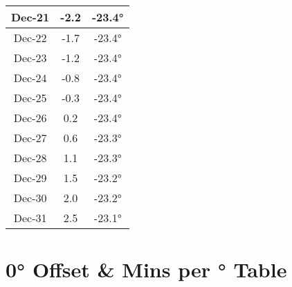 \begin{footnotesize}
\begin{minipage}{0.33\textwidth}
\begin{tabular}[t]{c | c | c}
Dec-21 & -2.2 & -23.4°\\\hline
Dec-22 & -1.7 & -23.4°\\\hline
Dec-23 & -1.2 & -23.4°\\\hline
Dec-24 & -0.8 & -23.4°\\\hline
Dec-25 & -0.3 & -23.4°\\\hline
Dec-26 & 0.2 & -23.4°\\\hline
Dec-27 & 0.6 & -23.3°\\\hline
Dec-28 & 1.1 & -23.3°\\\hline
Dec-29 & 1.5 & -23.2°\\\hline
Dec-30 & 2.0 & -23.2°\\\hline
Dec-31 & 2.5 & -23.1°\\\hline
\end{tabular}\end{minipage}
\end{footnotesize}

\section{0° Offset \& Mins per ° Table}


